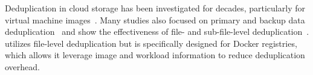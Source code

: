 %
%
%
%
%
%
%

Deduplication in cloud storage has been investigated for decades, particularly for virtual machine
images~\cite{zhou2013characterizing,srinivasan2012idedup,jin2009effectiveness, jayaram2011empirical}.
%
Many studies also focused on primary and backup data
deduplication~\cite{tarasov2014dmdedup,muthitacharoen2001low,lu2012insights,2009-sparse_indexing_inline_dedup_using_sampling-fast,2013-charact_increment_changes_data_protect-atc,wallace2012characteristics,zhu2008avoiding, lillibridge2013improving,
fu2014accelerating,fu2015design,fu2011aa}
and show the effectiveness of file- and sub-file-level
deduplication~\cite{2012-hpc_practical_dedup_study-sc,msst16dedup-study}.
%
\sysname utilizes file-level deduplication but is specifically designed for Docker registries,
which allows it leverage image and workload information to reduce deduplication overhead.
%



